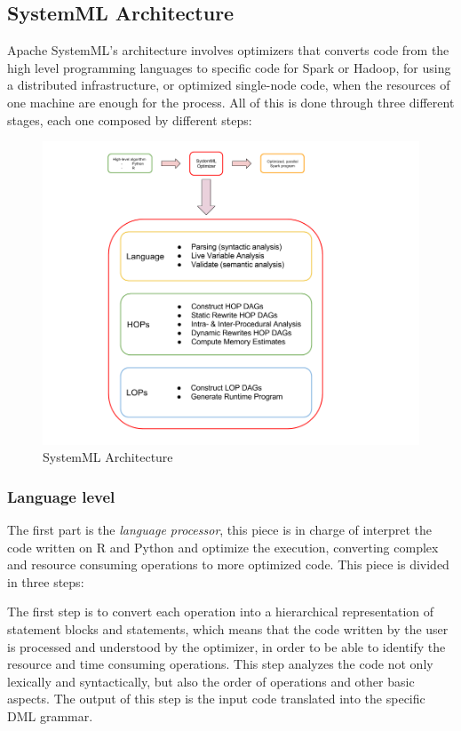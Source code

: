 \documentclass[11pt]{book} %
\begin{document}
    \subsection{SystemML Architecture}

      Apache SystemML's architecture involves optimizers that converts code from the high level programming languages to specific code for Spark or Hadoop, for using a distributed infrastructure, or optimized single-node code, when the resources of one machine are enough for the process. All of this is done through three different stages, each one composed by different steps:

      \begin{figure}[!ht]
        \centering
        \includegraphics[width=\textwidth]{systemml_structure.png}
        \caption{SystemML Architecture}
        \label{img:systemml_architecture}
      \end{figure}

      \subsubsection{Language level}

        The first part is the \emph{language processor}, this piece is in charge of interpret the code written on R and Python and optimize the execution, converting complex and resource consuming operations to more optimized code. This piece is divided in three steps:

        The first step is to convert each operation into a hierarchical representation of statement blocks and statements, which means that the code written by the user is processed and understood by the optimizer, in order to be able to identify the resource and time consuming operations. This step analyzes the code not only lexically and syntactically, but also the order of operations and other basic aspects. The output of this step is the input code translated into the specific DML grammar.
\end{document}
